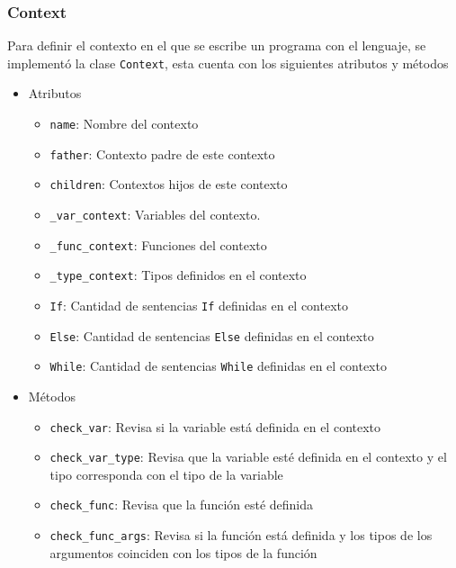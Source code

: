 \subsubsection{Context}
Para definir el contexto en el que se escribe un programa con el lenguaje, se implement\'o la clase \verb|Context|, esta cuenta con los siguientes atributos y m\'etodos 
\begin{itemize}
\item Atributos
\begin{itemize}
\item \verb|name|: Nombre del contexto 

\item \verb|father|: Contexto padre de este contexto

\item \verb|children|: Contextos hijos de este contexto

\item \verb|_var_context|: Variables del contexto. 

\item \verb|_func_context|: Funciones del contexto

\item \verb|_type_context|: Tipos definidos en el contexto

\item \verb|If|: Cantidad de sentencias \verb|If| definidas en el contexto

\item \verb|Else|: Cantidad de sentencias \verb|Else| definidas en el contexto

\item \verb|While|: Cantidad de sentencias \verb|While| definidas en el contexto
\end{itemize}

\item M\'etodos
\begin{itemize}
\item \verb|check_var|: Revisa si la variable est\'a definida en el contexto

	\item \verb|check_var_type|: Revisa que la variable est\'e definida en el contexto y el tipo corresponda con el tipo de la variable
	
	\item \verb|check_func|: Revisa que la funci\'on est\'e definida
	
	\item \verb|check_func_args|: Revisa si la funci\'on est\'a definida y los tipos de los argumentos coinciden con los tipos de la funci\'on
	

\end{itemize}
\end{itemize}
